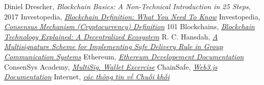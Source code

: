 \newpage
\begin{thebibliography}{}
     Diniel Drescher, \textit{Blockchain Basics: A Non-Technical Introduction in 25 Steps}, 2017
     Investopedia, \textit{\href{https://www.investopedia.com/terms/b/blockchain.asp}{Blockchain Definition: What You Need To Know}}
     Investopedia, \textit{\href{https://www.investopedia.com/terms/c/consensus-mechanism-cryptocurrency.asp}{Consensus Mechanism (Cryptocurrency) Definition}}
     101 Blockchains, \textit{\href{https://101blockchains.com/blockchain-technology-explained/}{Blockchain Technology Explained: A Decentralized Ecosystem}}
     R. C. Hansdah, \textit{\href{https://www.researchgate.net/publication/225674307_A_Multisignature_Scheme_for_Implementing_Safe_Delivery_Rule_in_Group_Communication_Systems}{A Multisignature Scheme for Implementing Safe Delivery Rule in Group Communication Systems}}
     Ethereum, \textit{\href{https://ethereum.org/en/developers/docs/}{Ethereum Developement Documentation}}
     ConsenSys Academy, \textit{\href{https://github.com/ConsenSys-Academy/multisig-wallet-exercise}{MultiSig. Wallet Excercise}}
     ChainSafe, \textit{\href{https://web3js.readthedocs.io/en/v1.7.0/}{Web3.js Documentation}}
     Internet, \textit{\href{https://letmegooglethat.com/?q=blockchain}{các thông tin về Chuỗi khối}}
\end{thebibliography}